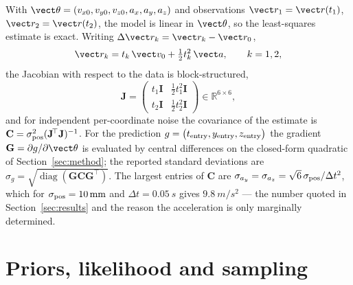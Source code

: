 With $\vect\theta=(v_{x0},v_{y0},v_{z0},a_x,a_y,a_z)$ and observations
$\vect r_1=\vect r(t_1)$, $\vect r_2=\vect r(t_2)$, the model is linear in
$\vect\theta$, so the least-squares estimate is exact. Writing
$\Delta\vect r_k=\vect r_k-\vect r_0$,
\begin{equation}
  \vect r_k = t_k\,\vect v_0 + \tfrac12 t_k^{2}\,\vect a ,
  \qquad k=1,2 ,
\end{equation}
the Jacobian with respect to the data is block-structured,
\begin{equation}
  \mathbf{J} =
  \begin{pmatrix}
    t_1\mathbf{I} & \tfrac12 t_1^{2}\mathbf{I}\\[2pt]
    t_2\mathbf{I} & \tfrac12 t_2^{2}\mathbf{I}
  \end{pmatrix}
  \in\mathbb R^{6\times 6} ,
\end{equation}
and for independent per-coordinate noise the covariance of the
estimate is $\mathbf{C}=\sigma_{\rm pos}^{2}(\mathbf{J}^{\!\top}\mathbf{J})^{-1}$.
For the prediction $g=\bigl(t_{\rm entry},y_{\rm entry},z_{\rm entry}\bigr)$
the gradient $\mathbf{G}=\partial g/\partial\vect\theta$ is evaluated by central
differences on the closed-form quadratic of Section~\ref{sec:method}; the
reported standard deviations are
$\sigma_g=\sqrt{\operatorname{diag}(\mathbf{G}\mathbf{C}\mathbf{G}^{\!\top})}$.
The largest entries of $\mathbf{C}$ are
$\sigma_{a_y}=\sigma_{a_z}=\sqrt{6}\,\sigma_{\rm pos}/\Delta t^{2}$, which
for $\sigma_{\rm pos}=\SI{10}{mm}$ and $\Delta t=\SI{0.05}{s}$ gives
$\SI{9.8}{m/s^2}$ --- the number quoted in Section~\ref{sec:results} and the
reason the acceleration is only marginally determined.

\section{Priors, likelihood and sampling}
\label{app:priors}

